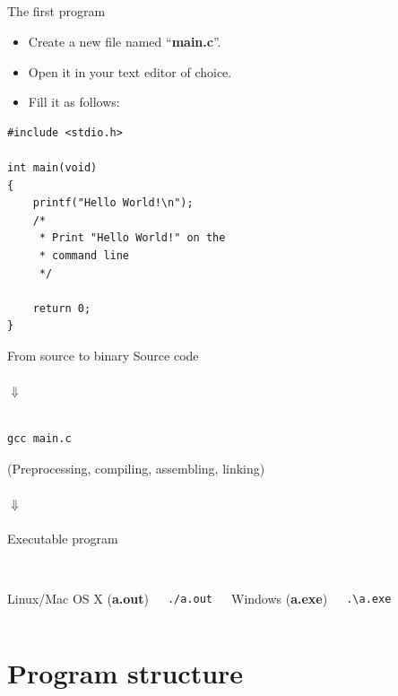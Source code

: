 \subsection{}
\begin{frame}[fragile]{The first program}
	\begin{itemize}
		\item Create a new file named ``\textbf{main.c}''.
		\item Open it in your text editor of choice.
		\item Fill it as follows:
	\end{itemize}
	\begin{lstlisting}
#include <stdio.h>

int main(void)
{
	printf("Hello World!\n");
	/*
	 * Print "Hello World!" on the
	 * command line
	 */

	return 0;
}
\end{lstlisting}
\end{frame}
\begin{frame}[fragile]{From source to binary}
	\centering
	Source code\\\ \\
	$\Downarrow$\\\ \\
	\begin{lstlisting}[numbers=none]
gcc main.c
\end{lstlisting}
(Preprocessing, compiling, assembling, linking)
	\ \\\ \\
	$\Downarrow$\\\ \\
	Executable program\\\ \\
	\begin{columns}[T]
		Linux/Mac OS X (\textbf{a.out})
		\begin{lstlisting}[numbers=none]
./a.out
\end{lstlisting}
		Windows (\textbf{a.exe})
		\begin{lstlisting}[numbers=none]
.\a.exe
\end{lstlisting}
	\end{columns}
\end{frame}
\section{Program structure}
\subsection{}

